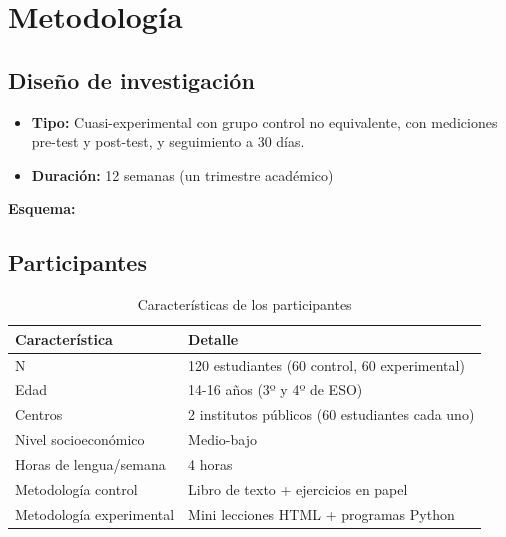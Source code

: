 \documentclass[12pt,spanish]{article}
\begin{document}
\newpage
\section{Metodología}

\subsection{Diseño de investigación}

\begin{itemize}
    \item \textbf{Tipo:} Cuasi-experimental con grupo control no equivalente, con mediciones pre-test y post-test, y seguimiento a 30 días.
    \item \textbf{Duración:} 12 semanas (un trimestre académico)
\end{itemize}

\textbf{Esquema:}

\begin{center}
\end{center}

\subsection{Participantes}

\begin{table}[H]
\centering
\caption{Características de los participantes}
\label{tab:participantes}
\begin{tabular}{|p{4cm}|p{8cm}|}
\hline
\textbf{Característica} & \textbf{Detalle} \\
\hline
N & 120 estudiantes (60 control, 60 experimental) \\
\hline
Edad & 14-16 años (3º y 4º de ESO) \\
\hline
Centros & 2 institutos públicos (60 estudiantes cada uno) \\
\hline
Nivel socioeconómico & Medio-bajo \\
\hline
Horas de lengua/semana & 4 horas \\
\hline
Metodología control & Libro de texto + ejercicios en papel \\
\hline
Metodología experimental & Mini lecciones HTML + programas Python \\
\hline
\end{tabular}
\end{table}
\end{document}
